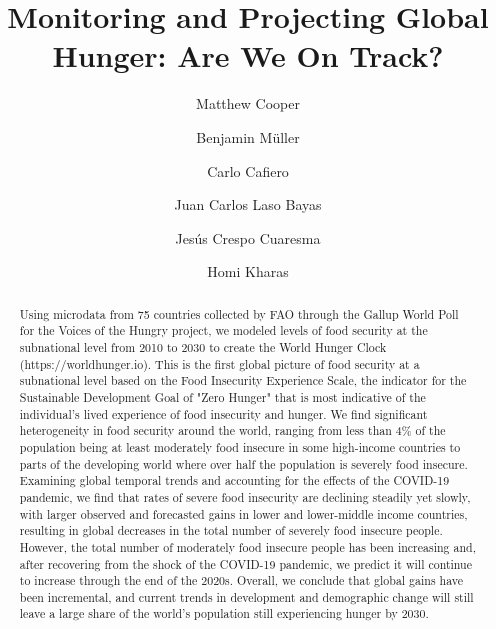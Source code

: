 \documentclass{article}
\begin{document}
\title{Monitoring and Projecting Global Hunger: Are We On Track?}

\author[1,2,*]{Matthew Cooper}
\author[2,3]{Benjamin Müller}
\author[4]{Carlo Cafiero}
\author[2,5]{Juan Carlos Laso Bayas}
\author[3,5,6,7]{Jesús Crespo Cuaresma}
\author[2,8]{Homi Kharas}


\maketitle
\begin{abstract}
Using microdata from 75 countries collected by FAO through the Gallup World Poll for the Voices of the Hungry project, we modeled levels of food security at the subnational level from 2010 to 2030 to create the World Hunger Clock (https://worldhunger.io).  This is the first global picture of food security at a subnational level based on the Food Insecurity Experience Scale, the indicator for the Sustainable Development Goal of "Zero Hunger" that is most indicative of the individual's lived experience of food insecurity and hunger.  We find significant heterogeneity in food security around the world, ranging from less than 4\% of the population being at least moderately food insecure in some high-income countries to parts of the developing world where over half the population is severely food insecure.  Examining global temporal trends and accounting for the effects of the COVID-19 pandemic, we find that rates of severe food insecurity are declining steadily yet slowly, with larger observed and forecasted gains in lower and lower-middle income countries, resulting in global decreases in the total number of severely food insecure people.  However, the total number of moderately food insecure people has been increasing and, after recovering from the shock of the COVID-19 pandemic, we predict it will continue to increase through the end of the 2020s.  Overall, we conclude that global gains have been incremental, and current trends in development and demographic change will still leave a large share of the world's population still experiencing hunger by 2030.  \end{abstract}
\end{document}
